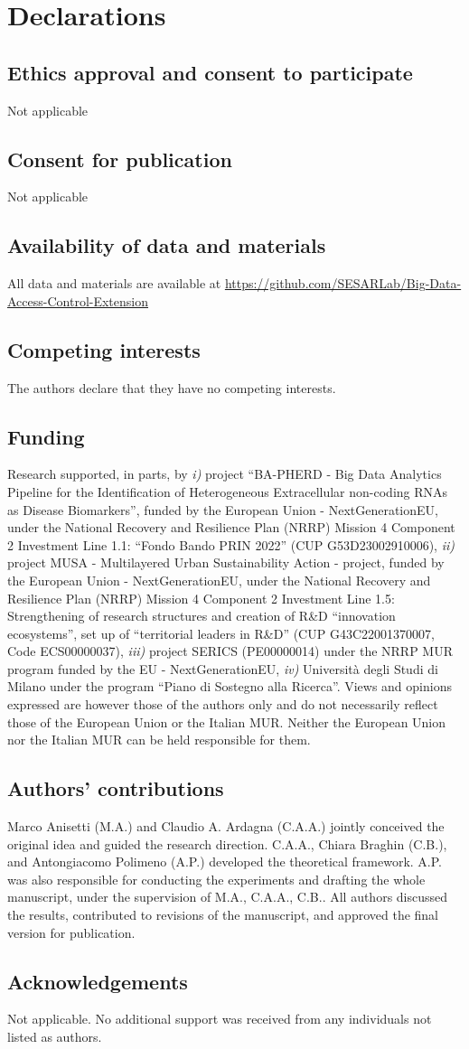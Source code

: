 \section{Declarations}
\subsection{Ethics approval and consent to participate}
Not applicable
\subsection{Consent for publication}
Not applicable
\subsection{Availability of data and materials}
All data and materials are available at \url{https://github.com/SESARLab/Big-Data-Access-Control-Extension}
\subsection{Competing interests}
The authors declare that they have no competing interests.
\subsection{Funding}
Research supported, in parts, by \emph{i)} project ``BA-PHERD - Big Data Analytics Pipeline for the Identification of Heterogeneous Extracellular non-coding RNAs as Disease Biomarkers'', funded by the European Union - NextGenerationEU, under the National Recovery and Resilience Plan (NRRP) Mission 4 Component 2 Investment Line 1.1: “Fondo Bando PRIN 2022” (CUP G53D23002910006), \emph{ii)} project MUSA - Multilayered Urban Sustainability Action - project, funded by the European Union - NextGenerationEU, under the National Recovery and Resilience Plan (NRRP) Mission 4 Component 2 Investment Line 1.5: Strengthening of research structures and creation of R\&D ``innovation ecosystems'', set up of ``territorial leaders in R\&D'' (CUP  G43C22001370007, Code ECS00000037), \emph{iii)} project SERICS (PE00000014) under the
NRRP MUR program funded by the EU - NextGenerationEU, \emph{iv)} Università degli Studi di Milano under the program ``Piano di Sostegno alla Ricerca''. Views and opinions expressed are however those of the authors only and do not necessarily reflect those of the European Union or the Italian MUR. Neither the European Union nor the Italian MUR can be held responsible for them.
\subsection{Authors' contributions}
Marco Anisetti (M.A.) and Claudio A. Ardagna (C.A.A.) jointly conceived the original idea and guided the research direction. C.A.A., Chiara Braghin (C.B.), and Antongiacomo Polimeno (A.P.) developed the theoretical framework. A.P. was also responsible for conducting the experiments and drafting the whole manuscript, under the supervision of M.A., C.A.A., C.B.. All authors discussed the results, contributed to revisions of the manuscript, and approved the final version for publication.

\subsection{Acknowledgements}
Not applicable. No additional support was received from any individuals not listed as authors.